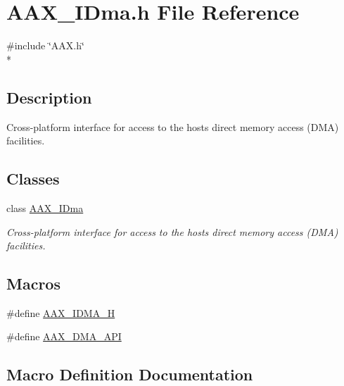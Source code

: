\hypertarget{a00243}{}\section{A\+A\+X\+\_\+\+I\+Dma.\+h File Reference}
\label{a00243}
{\ttfamily \#include \char`\"{}A\+A\+X.\+h\char`\"{}}\\*


\subsection{Description}
Cross-\/platform interface for access to the host\textquotesingle{}s direct memory access (D\+M\+A) facilities. 

\subsection*{Classes}
\begin{DoxyCompactItemize}
\item 
class \hyperlink{a00095}{A\+A\+X\+\_\+\+I\+Dma}
\begin{DoxyCompactList}\small\item\em Cross-\/platform interface for access to the host\textquotesingle{}s direct memory access (D\+M\+A) facilities. \end{DoxyCompactList}\end{DoxyCompactItemize}
\subsection*{Macros}
\begin{DoxyCompactItemize}
\item 
\#define \hyperlink{a00243_a429fd1cdbaca575330b0ebbe5de8f886}{A\+A\+X\+\_\+\+I\+D\+M\+A\+\_\+\+H}
\item 
\#define \hyperlink{a00243_acae60d01e5e4bd3282369d0d9d378f3f}{A\+A\+X\+\_\+\+D\+M\+A\+\_\+\+A\+P\+I}
\end{DoxyCompactItemize}


\subsection{Macro Definition Documentation}
\hypertarget{a00243_a429fd1cdbaca575330b0ebbe5de8f886}{}
